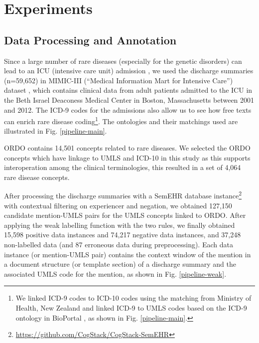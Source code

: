 \documentclass[letterpaper, 10 pt, conference]{ieeeconf}
\begin{document}
\section{Experiments}
\subsection{Data Processing and Annotation}
Since a large number of rare diseases (especially for the genetic disorders) can lead to an ICU (intensive care unit) admission \cite{textoris_genetic_2014}, we used the discharge summaries (n=59,652) in MIMIC-III (``Medical Information Mart for Intensive Care'') dataset \cite{johnson_mimic-iii_2016}, which contains clinical data from adult patients admitted to the ICU in the Beth Israel Deaconess Medical Center in Boston, Massachusetts between 2001 and 2012. The ICD-9 codes for the admissions also allow us to see how free texts can enrich rare disease coding\footnote{We linked ICD-9 codes to ICD-10 codes using the matching from Ministry of Health, New Zealand \cite{icd9to10newzeland} and linked ICD-9 to UMLS codes based on the ICD-9 ontology in BioPortal \cite{icd9ontology}, as shown in Fig. \ref{pipeline-main}.}. The ontologies and their matchings used are illustrated in Fig. \ref{pipeline-main}.

ORDO contains 14,501 concepts related to rare diseases. We selected the ORDO concepts which have linkage to UMLS and ICD-10 in this study as this supports interoperation among the clinical terminologies, this resulted in a set of 4,064 rare disease concepts.

After processing the discharge summaries with a SemEHR database instance\footnote{\url{https://github.com/CogStack/CogStack-SemEHR}} \cite{Wu2018semehr} with contextual filtering on experiencer and negation, we obtained 127,150 candidate mention-UMLS pairs for the UMLS concepts linked to ORDO. After applying the weak labelling function with the two rules, we finally obtained 15,598 positive data instances and 74,217 negative data instances, and 37,248 non-labelled data (and 87 erroneous data during preprocessing). Each data instance (or mention-UMLS pair) contains the context window of the mention in a document structure (or template section) of a discharge summary and the associated UMLS code for the mention, as shown in Fig. \ref{pipeline-weak}.
\end{document}
